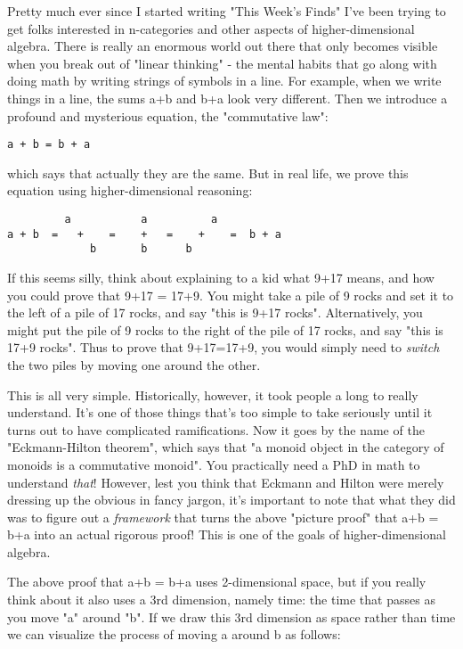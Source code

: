 

Pretty much ever since I started writing "This Week's Finds" I've been
trying to get folks interested in n-categories and other aspects of
higher-dimensional algebra.  There is really an enormous world out
there that only becomes visible when you break out of "linear
thinking" - the mental habits that go along with doing math by writing
strings of symbols in a line.  For example, when we write things in a
line, the sums a+b and b+a look very different.  Then we introduce
a profound and mysterious equation, the "commutative law":

\begin{verbatim}
a + b = b + a
\end{verbatim}
    
which says that actually they are the same.  But in real life,
we prove this equation using higher-dimensional reasoning:
          
\begin{verbatim}
         a           a          a
a + b  =   +    =    +   =    +    =  b + a
             b       b      b
\end{verbatim}
    

If this seems silly, think about explaining to a kid what 9+17 means,
and how you could prove that 9+17 = 17+9.  You might take a pile of 9
rocks and set it to the left of a pile of 17 rocks, and say "this is
9+17 rocks".  Alternatively, you might put the pile of 9 rocks to the
right of the pile of 17 rocks, and say "this is 17+9 rocks".  Thus to
prove that 9+17=17+9, you would simply need to \emph{switch} the two piles
by moving one around the other.  

This is all very simple.  Historically, however, it took people a long
to really understand.  It's one of those things that's too simple to
take seriously until it turns out to have complicated ramifications.
Now it goes by the name of the "Eckmann-Hilton theorem", which says
that "a monoid object in the category of monoids is a commutative
monoid".  You practically need a PhD in math to understand \emph{that}!
However, lest you think that Eckmann and Hilton were merely dressing
up the obvious in fancy jargon, it's important to note that what they
did was to figure out a \emph{framework} that turns the above "picture
proof" that a+b = b+a into an actual rigorous proof!  This is one of
the goals of higher-dimensional algebra.

The above proof that a+b = b+a uses 2-dimensional space, but if you
really think about it also uses a 3rd dimension, namely time: the time
that passes as you move "a" around "b".  If we draw this 3rd dimension
as space rather than time we can visualize the process of moving a
around b as follows:

